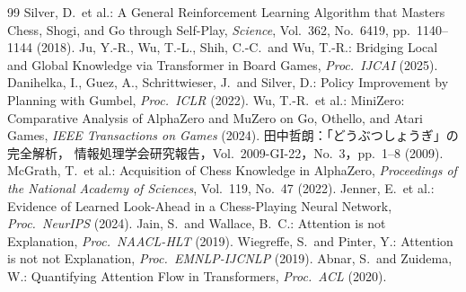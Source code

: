 \documentclass[a4paper,10pt,twocolumn]{ltjsarticle}
\begin{document}
\begin{thebibliography}{99}
\small
{} Silver, D.\ et al.: A General Reinforcement Learning Algorithm that
  Masters Chess, Shogi, and Go through Self-Play, \textit{Science}, Vol.~362,
  No.~6419, pp.~1140--1144 (2018).
 Ju, Y.-R., Wu, T.-L., Shih, C.-C.\ and Wu, T.-R.: Bridging Local and
  Global Knowledge via Transformer in Board Games, \textit{Proc.\ IJCAI} (2025).
 Danihelka, I., Guez, A., Schrittwieser, J.\ and Silver, D.: Policy
  Improvement by Planning with Gumbel, \textit{Proc.\ ICLR} (2022).
 Wu, T.-R.\ et al.: MiniZero: Comparative Analysis of AlphaZero and
  MuZero on Go, Othello, and Atari Games, \textit{IEEE Transactions on Games} (2024).
 田中哲朗：「どうぶつしょうぎ」の完全解析，
  情報処理学会研究報告，Vol.~2009-GI-22，No.~3，pp.~1--8 (2009).
 McGrath, T.\ et al.: Acquisition of Chess Knowledge in AlphaZero,
  \textit{Proceedings of the National Academy of Sciences}, Vol.~119, No.~47 (2022).
 Jenner, E.\ et al.: Evidence of Learned Look-Ahead in a Chess-Playing
  Neural Network, \textit{Proc.\ NeurIPS} (2024).
 Jain, S.\ and Wallace, B.~C.: Attention is not Explanation,
  \textit{Proc.\ NAACL-HLT} (2019).
 Wiegreffe, S.\ and Pinter, Y.: Attention is not not Explanation,
  \textit{Proc.\ EMNLP-IJCNLP} (2019).
 Abnar, S.\ and Zuidema, W.: Quantifying Attention Flow in Transformers,
  \textit{Proc.\ ACL} (2020).
\end{thebibliography}
\end{document}
